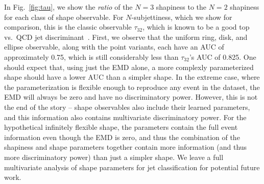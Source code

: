 \documentclass[letterpaper,11pt]{article}
\DeclareRobustCommand{\Fig}[1]{Fig.~\ref{fig:#1}}
\begin{document}
In \Fig{tau}, we show the \emph{ratio} of the $N=3$ shapiness to the $N=2$ shapiness for each class of shape observable. For $N$-subjettiness, which we show for comparison, this is the classic observable $\tau_{32}$, which is known to be a good top vs.\ QCD jet discriminant~\cite{Thaler:2010tr}. First, we observe that the uniform ring, disk, and ellipse observable, along with the point variants, each have an AUC of approximately 0.75, which is still considerably less than $\tau_{32}$'s AUC of 0.825. One should expect that, using just the EMD alone, a more complexly parameterized shape should have a lower AUC than a simpler shape. In the extreme case, where the parameterization is flexible enough to reproduce any event in the dataset, the EMD will always be zero and have no discriminatory power. However, this is not the end of the story -- shape observables also include their learned parameters, and this information also contains multivariate discriminatory power. For the hypothetical infinitely flexible shape, the parameters contain the full event information even though the EMD is zero, and thus the combination of the shapiness and shape parameters together contain more information (and thus more discriminatory power) than just a simpler shape. We leave a full multivariate analysis of shape parameters for jet classification for potential future work.


\begin{figure*}[tp]
    \centering
    \vspace{1pt}
    \vspace{1pt}
    \vspace{1pt}
    \caption{
        Top row: Distributions of the $N=3$ to $N=2$ ratio of the (a) $N$-subjettiness of the top (red) and QCD (blue) jet sample. Middle row: The same ratio, but for the $N$- (b) ringiness, (c) diskiness, and (d) ellipsiness. Bottom row: The same, but for the $N$- (e) (ring$+$point)iness, (f) (disk$+$point)iness, and (g) (ellipse$+$point)iness. 
        }
    \label{fig:tau}
\end{figure*}
\end{document}
